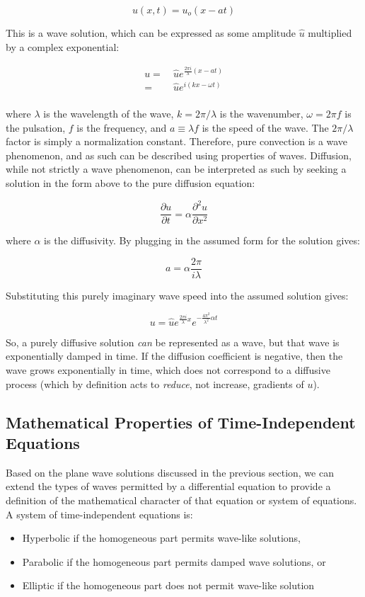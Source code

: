 \documentclass[10pt]{article}
\newcommand{\beq}{\begin{equation}}
\newcommand{\eeq}{\end{equation}}
\newcommand{\beqa}{\begin{equation}\begin{aligned}}
\newcommand{\eeqa}{\end{aligned}\end{equation}}
\begin{document}
\begin{flushleft}
\beq
u(x,t)=u_o(x-at)
\eeq

This is a wave solution, which can be expressed as some amplitude \(\hat{u}\) multiplied by a complex exponential:

\beqa
u=&\ \hat{u}e^{\frac{2\pi i}{\lambda}(x-at)}\\
=&\ \hat{u}e^{i(kx-\omega t)}\\
\eeqa

where \(\lambda\) is the wavelength of the wave, \(k=2\pi/\lambda\) is the wavenumber, \(\omega=2\pi f\) is the pulsation, \(f\) is the frequency, and \(a\equiv\lambda f\) is the speed of the wave. The \(2\pi/\lambda\) factor is simply a normalization constant. Therefore, pure convection is a wave phenomenon, and as such can be described using properties of waves. Diffusion, while not strictly a wave phenomenon, can be interpreted as such by seeking a solution in the form above to the pure diffusion equation:

\beq
\frac{\partial u}{\partial t}=\alpha \frac{\partial^2u}{\partial x^2}
\eeq

where \(\alpha\) is the diffusivity. By plugging in the assumed form for the solution gives:

\beq
a=\alpha\frac{2\pi}{i\lambda}
\eeq

Substituting this purely imaginary wave speed into the assumed solution gives:

\beq
u=\hat{u}e^{\frac{2\pi i}{\lambda}x}e^{-\frac{4\pi^2}{\lambda^2}\alpha t}
\eeq

So, a purely diffusive solution {\it can} be represented as a wave, but that wave is exponentially damped in time. If the diffusion coefficient is negative, then the wave grows exponentially in time, which does not correspond to a diffusive process (which by definition acts to {\it reduce}, not increase, gradients of \(u\)). 

\subsection{Mathematical Properties of Time-Independent Equations}
Based on the plane wave solutions discussed in the previous section, we can extend the types of waves permitted by a differential equation to provide a definition of the mathematical character of that equation or system of equations. A system of time-independent equations is:

\begin{itemize}
\item Hyperbolic if the homogeneous part permits wave-like solutions,
\item Parabolic if the homogeneous part permits damped wave solutions, or
\item Elliptic if the homogeneous part does not permit wave-like solution
\end{itemize}


\end{flushleft}
\end{document}
